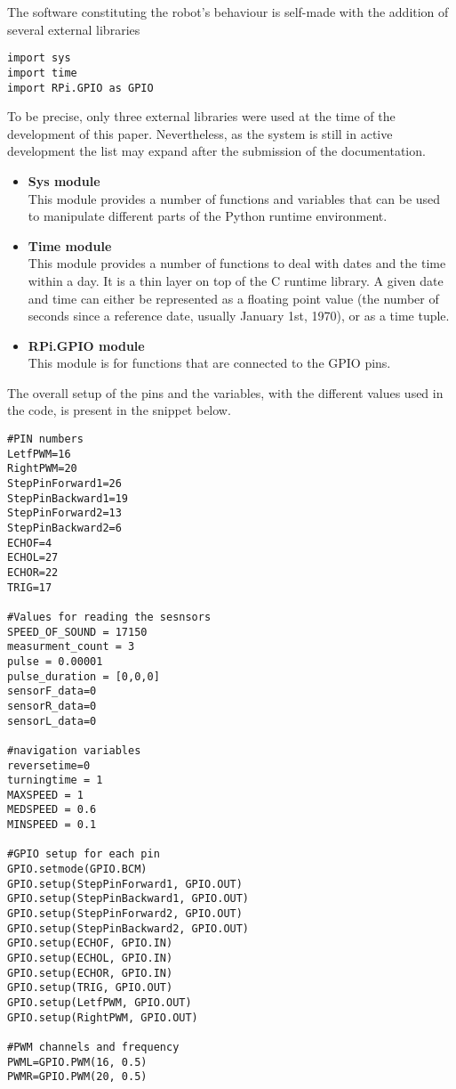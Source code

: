 The software constituting the robot's behaviour is self-made with the addition of several external libraries 

\begin{lstlisting}
import sys
import time
import RPi.GPIO as GPIO
\end{lstlisting}

To be precise, only three external libraries were used at the time of the development of this paper. Nevertheless, as the system is still in active development the list may expand after the submission of the documentation.

\begin{itemize}

\item \textbf{Sys module} \\ This module provides a number of functions and variables that can be used to manipulate different parts of the Python runtime environment. \cite{sys_module}

\item \textbf{Time module} \\ This module provides a number of functions to deal with dates and the time within a day. It is a thin layer on top of the C runtime library.
A given date and time can either be represented as a floating point value (the number of seconds since a reference date, usually January 1st, 1970), or as a time tuple. \cite{time_module}

\item \textbf{RPi.GPIO module} \\ This module is for functions that are connected to the GPIO pins.
\end{itemize}

The overall setup of the pins and the variables, with the different values used in the code, is present in the snippet below.

\begin{lstlisting}
#PIN numbers
LetfPWM=16
RightPWM=20
StepPinForward1=26
StepPinBackward1=19
StepPinForward2=13
StepPinBackward2=6
ECHOF=4
ECHOL=27
ECHOR=22
TRIG=17

#Values for reading the sesnsors
SPEED_OF_SOUND = 17150
measurment_count = 3
pulse = 0.00001	
pulse_duration = [0,0,0]
sensorF_data=0
sensorR_data=0
sensorL_data=0

#navigation variables
reversetime=0
turningtime = 1
MAXSPEED = 1
MEDSPEED = 0.6
MINSPEED = 0.1

#GPIO setup for each pin 
GPIO.setmode(GPIO.BCM)
GPIO.setup(StepPinForward1, GPIO.OUT)
GPIO.setup(StepPinBackward1, GPIO.OUT)
GPIO.setup(StepPinForward2, GPIO.OUT)
GPIO.setup(StepPinBackward2, GPIO.OUT)
GPIO.setup(ECHOF, GPIO.IN)
GPIO.setup(ECHOL, GPIO.IN)
GPIO.setup(ECHOR, GPIO.IN)
GPIO.setup(TRIG, GPIO.OUT)
GPIO.setup(LetfPWM, GPIO.OUT)
GPIO.setup(RightPWM, GPIO.OUT)

#PWM channels and frequency
PWML=GPIO.PWM(16, 0.5)
PWMR=GPIO.PWM(20, 0.5)
\end{lstlisting}

